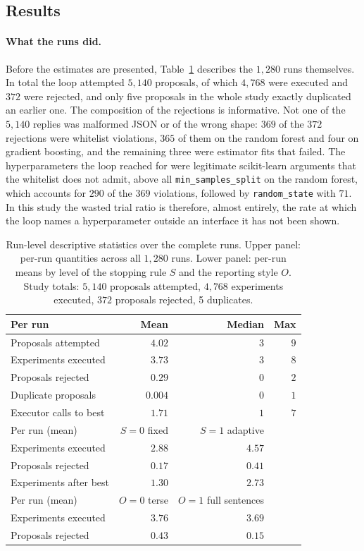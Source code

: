 \documentclass[11pt]{article}
\begin{document}
\subsection{Results}
\label{sec:results}

\paragraph{What the runs did.} Before the estimates are presented, Table~\ref{tab:descriptives} describes the $1{,}280$ runs themselves. In total the loop attempted $5{,}140$ proposals, of which $4{,}768$ were executed and $372$ were rejected, and only five proposals in the whole study exactly duplicated an earlier one. The composition of the rejections is informative. Not one of the $5{,}140$ replies was malformed JSON or of the wrong shape: $369$ of the $372$ rejections were whitelist violations, $365$ of them on the random forest and four on gradient boosting, and the remaining three were estimator fits that failed. The hyperparameters the loop reached for were legitimate scikit-learn arguments that the whitelist does not admit, above all \texttt{min\_samples\_split} on the random forest, which accounts for $290$ of the $369$ violations, followed by \texttt{random\_state} with $71$. In this study the wasted trial ratio is therefore, almost entirely, the rate at which the loop names a hyperparameter outside an interface it has not been shown.

\begin{table}[t]
\centering
\small
\caption{Run-level descriptive statistics over the complete runs. Upper panel: per-run quantities across all $1{,}280$ runs. Lower panel: per-run means by level of the stopping rule $S$ and the reporting style $O$. Study totals: $5{,}140$ proposals attempted, $4{,}768$ experiments executed, $372$ proposals rejected, 5 duplicates.}
\label{tab:descriptives}
\begin{tabular}{lrrr}
\toprule
Per run & Mean & Median & Max \\
\midrule
Proposals attempted    & $4.02$  & $3$ & $9$ \\
Experiments executed   & $3.73$  & $3$ & $8$ \\
Proposals rejected     & $0.29$  & $0$ & $2$ \\
Duplicate proposals    & $0.004$ & $0$ & $1$ \\
Executor calls to best & $1.71$  & $1$ & $7$ \\
\midrule
Per run (mean) & $S=0$ fixed & $S=1$ adaptive & \\
\midrule
Experiments executed   & $2.88$ & $4.57$ & \\
Proposals rejected     & $0.17$ & $0.41$ & \\
Experiments after best & $1.30$ & $2.73$ & \\
\midrule
Per run (mean) & $O=0$ terse & $O=1$ full sentences & \\
\midrule
Experiments executed   & $3.76$ & $3.69$ & \\
Proposals rejected     & $0.43$ & $0.15$ & \\
\bottomrule
\end{tabular}
\end{table}
\end{document}
